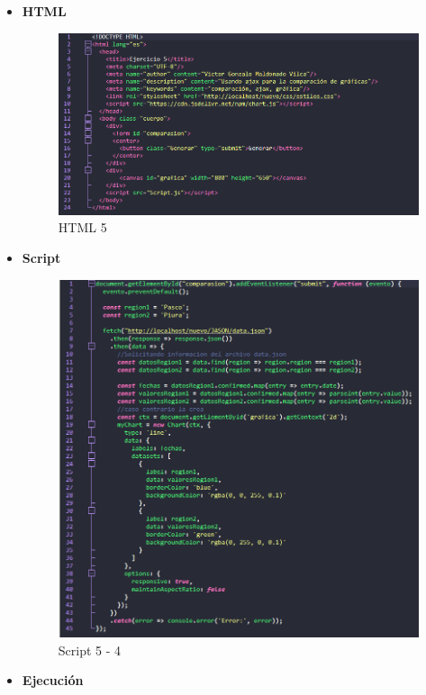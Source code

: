 \documentclass{article}
\begin{document}
\begin{itemize}
		\begin{itemize}
			\item \textbf{HTML}
			\begin{figure}[H]
				\centering
				\includegraphics[width=1\textwidth,keepaspectratio]{img/html5.png}
				\caption{HTML 5}
			\end{figure}
			\newpage
			\item \textbf{Script}
			\begin{figure}[H]
				\centering
				\includegraphics[width=1\textwidth,keepaspectratio]{img/Script5-4.png}
				\caption{Script 5 - 4}
			\end{figure}
			\newpage
			\item \textbf{Ejecución}
			\begin{figure}[H]

\end{figure}
\end{itemize}
\end{itemize}
\end{document}
